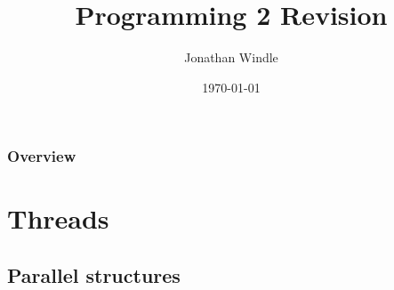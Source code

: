 \documentclass{beamer}
\title[Programming 2]{Programming 2 Revision} %
\author{Jonathan Windle} %
\institute[UEA] %
{
University of East Anglia \\ %
\medskip
\textit{J.Windle@uea.ac.uk} %
}
\date{\today} %
\begin{document}
\begin{frame}
\titlepage %
\end{frame}

\begin{frame}[allowframebreaks]
\frametitle{Overview} %
\tableofcontents %
\end{frame}


\section{Threads} %

\subsection{Parallel structures} %


\end{document}
